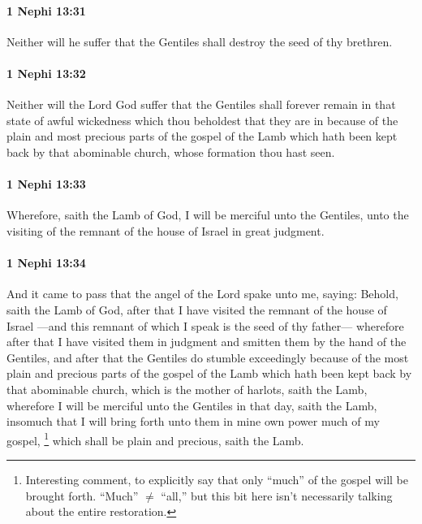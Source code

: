 		\paragraph{1 Nephi 13:31} %
			\label{1NEPHI-13-31}

			Neither will he suffer that the Gentiles shall destroy the seed of thy brethren.

		\paragraph{1 Nephi 13:32} %
			\label{1NEPHI-13-32}

			Neither will the Lord God suffer that the Gentiles shall forever remain
			in that state of awful wickedness which thou beholdest that they are in
			because of the plain and most precious parts of the gospel of the Lamb
			which hath been kept back by that abominable church,
			whose formation thou hast seen.

		\paragraph{1 Nephi 13:33} %
			\label{1NEPHI-13-33}

			Wherefore, saith the Lamb of God,
			I will be merciful unto the Gentiles,
			unto the visiting of the remnant of the house of Israel in great judgment.

		\paragraph{1 Nephi 13:34} %
			\label{1NEPHI-13-34}

			And it came to pass that the angel of the Lord spake unto me, saying:
			Behold, saith the Lamb of God,
			after that I have visited the remnant of the house of Israel
			---and this remnant of which I speak is the seed of thy father---
			wherefore after that I have visited them in judgment
			and smitten them by the hand of the Gentiles,
			and after that the Gentiles do stumble exceedingly
			because of the most plain and precious parts of the gospel of the Lamb
			which hath been kept back by that abominable church,
			which is the mother of harlots, saith the Lamb,
			wherefore I will be merciful unto the Gentiles in that day, saith the Lamb,
			insomuch that I will bring forth unto them in mine own power
			much of my gospel,%
				\footnote{%
					\label{1NEPHI-13-34-NOTE-much}%
					Interesting comment, to explicitly say that only ``much'' of the gospel will be brought forth. ``Much'' $\neq$ ``all,'' but this bit here isn't necessarily talking about the entire restoration.
					}
			which shall be plain and precious, saith the Lamb.

